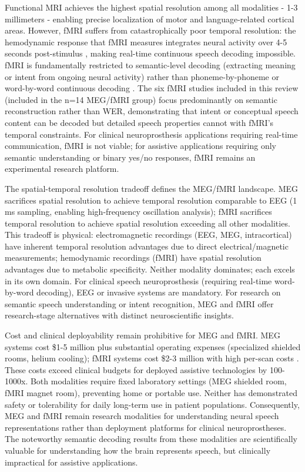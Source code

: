 Functional MRI achieves the highest spatial resolution among all modalities - 1-3 millimeters - enabling precise localization of motor and language-related cortical areas. However, fMRI suffers from catastrophically poor temporal resolution: the hemodynamic response that fMRI measures integrates neural activity over 4-5 seconds post-stimulus \cite{Logothetis2010,Hemodynamic2007}, making real-time continuous speech decoding impossible. fMRI is fundamentally restricted to semantic-level decoding (extracting meaning or intent from ongoing neural activity) rather than phoneme-by-phoneme or word-by-word continuous decoding \cite{Tang2025Semantic}. The six fMRI studies included in this review (included in the n=14 MEG/fMRI group) focus predominantly on semantic reconstruction rather than WER, demonstrating that intent or conceptual speech content can be decoded but detailed speech properties cannot with fMRI's temporal constraints. For clinical neuroprosthesis applications requiring real-time communication, fMRI is not viable; for assistive applications requiring only semantic understanding or binary yes/no responses, fMRI remains an experimental research platform.

The spatial-temporal resolution tradeoff defines the MEG/fMRI landscape. MEG sacrifices spatial resolution to achieve temporal resolution comparable to EEG (1 ms sampling, enabling high-frequency oscillation analysis); fMRI sacrifices temporal resolution to achieve spatial resolution exceeding all other modalities. This tradeoff is physical: electromagnetic recordings (EEG, MEG, intracortical) have inherent temporal resolution advantages due to direct electrical/magnetic measurements; hemodynamic recordings (fMRI) have spatial resolution advantages due to metabolic specificity. Neither modality dominates; each excels in its own domain. For clinical speech neuroprosthesis (requiring real-time word-by-word decoding), EEG or invasive systems are mandatory. For research on semantic speech understanding or intent recognition, MEG and fMRI offer research-stage alternatives with distinct neuroscientific insights.

Cost and clinical deployability remain prohibitive for MEG and fMRI. MEG systems cost \$1-5 million plus substantial operating expenses (specialized shielded rooms, helium cooling); fMRI systems cost \$2-3 million with high per-scan costs \cite{Vansteensel2023}. These costs exceed clinical budgets for deployed assistive technologies by 100-1000x. Both modalities require fixed laboratory settings (MEG shielded room, fMRI magnet room), preventing home or portable use. Neither has demonstrated safety or tolerability for daily long-term use in patient populations. Consequently, MEG and fMRI remain research modalities for understanding neural speech representations rather than deployment platforms for clinical neuroprostheses. The noteworthy semantic decoding results from these modalities are scientifically valuable for understanding how the brain represents speech, but clinically impractical for assistive applications.

